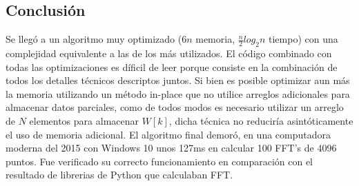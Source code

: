 \documentclass[assd_tp2_main.tex]{subfiles}
\begin{document}
\subsection{Conclusión}
Se llegó a un algoritmo muy optimizado ($6n$ memoria, $\frac{n}{2}log_2{n}$ tiempo) con una complejidad equivalente a las de los más utilizados.
El c\'odigo combinado con todas las optimizaciones es d\'ificil de leer porque consiste en la combinación de todos los detalles técnicos descriptos juntos.
Si bien es posible optimizar aun más la memoria utilizando un método in-place que no utilice arreglos adicionales para almacenar datos parciales, como de todos modos es necesario utilizar un arreglo de $N$ elementos para almacenar $W[k]$, dicha técnica no reduciría asintóticamente el uso de memoria adicional.
El algoritmo final demoró, en una computadora moderna del 2015 con Windows 10 unos 127ms en calcular 100 FFT's de 4096 puntos.
Fue verificado su correcto funcionamiento en comparación con el resultado de librerias de Python que calculaban FFT.
\end{document}
